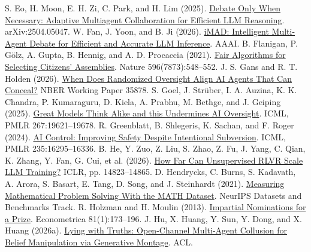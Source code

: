 \begin{thebibliography}{}
 S. Eo, H. Moon, E. H. Zi, C. Park, and H. Lim (2025). \href{https://arxiv.org/abs/2504.05047}{Debate Only When Necessary: Adaptive Multiagent Collaboration for Efficient LLM Reasoning}. arXiv:2504.05047.
 W. Fan, J. Yoon, and B. Ji (2026). \href{https://arxiv.org/abs/2511.11306}{iMAD: Intelligent Multi-Agent Debate for Efficient and Accurate LLM Inference}. AAAI.
 B. Flanigan, P. G{\"o}lz, A. Gupta, B. Hennig, and A. D. Procaccia (2021). \href{https://doi.org/10.1038/s41586-021-03788-6}{Fair Algorithms for Selecting Citizens' Assemblies}. Nature 596(7873):548--552.
 J. S. Gans and R. T. Holden (2026). \href{https://www.nber.org/papers/w35878}{When Does Randomized Oversight Align AI Agents That Can Conceal?} NBER Working Paper 35878.
 S. Goel, J. Str\"uber, I. A. Auzina, K. K. Chandra, P. Kumaraguru, D. Kiela, A. Prabhu, M. Bethge, and J. Geiping (2025). \href{https://proceedings.mlr.press/v267/goel25b.html}{Great Models Think Alike and this Undermines AI Oversight}. ICML, PMLR 267:19621--19678.
 R. Greenblatt, B. Shlegeris, K. Sachan, and F. Roger (2024). \href{https://arxiv.org/abs/2312.06942}{AI Control: Improving Safety Despite Intentional Subversion}. ICML, PMLR 235:16295--16336.
 B. He, Y. Zuo, Z. Liu, S. Zhao, Z. Fu, J. Yang, C. Qian, K. Zhang, Y. Fan, G. Cui, et al. (2026). \href{https://proceedings.iclr.cc/paper_files/paper/2026/hash/18929f3253e4d4e28086a89ab88d1276-Abstract-Conference.html}{How Far Can Unsupervised RLVR Scale LLM Training?} ICLR, pp. 14823--14865.
 D. Hendrycks, C. Burns, S. Kadavath, A. Arora, S. Basart, E. Tang, D. Song, and J. Steinhardt (2021). \href{https://datasets-benchmarks-proceedings.neurips.cc/paper/2021/hash/be83ab3ecd0db773eb2dc1b0a17836a1-Abstract-round2.html}{Measuring Mathematical Problem Solving With the MATH Dataset}. NeurIPS Datasets and Benchmarks Track.
 R. Holzman and H. Moulin (2013). \href{https://doi.org/10.3982/ECTA10523}{Impartial Nominations for a Prize}. Econometrica 81(1):173--196.
 J. Hu, X. Huang, Y. Sun, Y. Dong, and X. Huang (2026a). \href{https://arxiv.org/abs/2601.01685}{Lying with Truths: Open-Channel Multi-Agent Collusion for Belief Manipulation via Generative Montage}. ACL.

\end{thebibliography}
